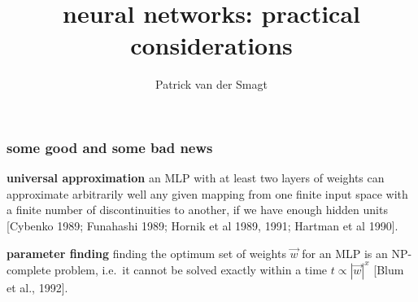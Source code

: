 \documentclass[USenglish,pdftex,compress,10pt,svgnamesi,handout]{beamer}
\title{neural networks: practical considerations}
\author{Patrick van der Smagt}
\date{}
\newcommand{\bfw}{\Vec{w}}
\begin{document}
\begin{frame}
	\titlepage
	
	\vfil
\end{frame}


\begin{frame}
\frametitle{some good and some bad news}
\hfill
\begin{beamerboxesrounded}[scheme=proof,width=0.95\textwidth,shadow=true]{\textbf{universal approximation}}
	an MLP with at least two layers of weights can approximate arbitrarily well any given mapping from one finite input space with a finite number of discontinuities to another, if we have enough hidden units [Cybenko 1989; Funahashi 1989; Hornik et al 1989, 1991; Hartman et al 1990].
\end{beamerboxesrounded}
\hspace*{\fill}
\bigskip
	\pause

\hfill
\begin{beamerboxesrounded}[scheme=proof,width=0.95\textwidth,shadow=true]{\textbf{parameter finding}}
	finding the optimum set of weights $\bfw$  for an MLP is an NP-complete problem, i.e.\ it cannot be solved exactly within a time $t\propto |\bfw|^x$ [Blum et al., 1992].
\end{beamerboxesrounded}
\hspace*{\fill}
\end{frame}












%
%
%
\end{document}
